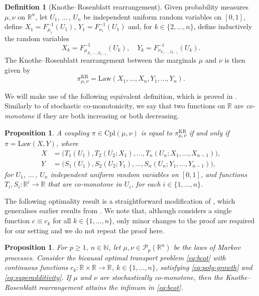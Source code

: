 \documentclass[onseside, final]{amsart}
\newtheorem{proposition}[theorem]{Proposition}
\theoremstyle{definition}
\newtheorem{definition}[theorem]{Definition}
\newcommand{\Pc}{\mathcal P}
\newcommand{\N}{\mathbb N}
\newcommand{\R}{\mathbb R}
\newcommand{\Law}{\mathrm{Law}}
\newcommand{\cpl}{\mathrm{Cpl}}
\newcommand{\kr}{\mathrm{KR}}
\numberwithin{equation}{section}
\begin{document}
			\begin{definition}[Knothe--Rosenblatt rearrangement]\label{def:kr}
					Given probability measures $\mu, \nu$ on $\R^n$, let $U_1$, $\dotsc\,$, $U_n$ be independent uniform random variables on $[0, 1]$, define $X_1 = F_{\mu_1}^{-1}(U_1)$, $Y_1 = F_{\nu_1}^{-1}(U_1)$ and, for $k \in \{2, \dotsc, n\}$, define inductively the random variables
				\begin{equation}
					X_k = F^{-1}_{\mu_{X_1, \dotsc, X_{k - 1}}}(U_k), \quad Y_k = F^{-1}_{\nu_{Y_1, \dotsc, Y_{k - 1}}}(U_k).
				\end{equation}
				The Knothe--Rosenblatt rearrangement between the marginals $\mu$ and $\nu$ is then given by 
				\[
				\pi^\kr_{\mu, \nu} = \Law(X_1, \dotsc, X_n, Y_1, \dotsc, Y_n).
				\]
			\end{definition}
			We will make use of the following equivalent definition, which is proved in \citet[Proposition 5.8]{BaBeLiZa17}. Similarly to  of stochastic co-monotonicity, we say that two functions on $\R$ are \emph{co-monotone} if they are both increasing or both decreasing.
			\begin{proposition}\label{rem:kr-equivalent-def}
				A coupling $\pi \in \cpl(\mu, \nu)$ is equal to $\pi^\kr_{\mu, \nu}$ if and only if $\pi = \Law(X, Y)$, where
				\begin{align}
						X & = \bigl(T_1(U_1), T_2(U_2; X_1), \dotsc, T_n(U_n; X_1, \dotsc, X_{n - 1})\bigr),\\
						Y & = \bigl(S_1(U_1), S_2(U_2; Y_1), \dotsc, S_n(U_n; Y_1, \dotsc, Y_{n - 1})\bigr),
				\end{align}
				for $U_1$, $\dotsc\,$, $U_n$ independent uniform random variables on $[0, 1]$, and functions $T_i, S_i \colon \R^i \to \R$ that are co-monotone in $U_i$, for each $i \in \{1, \dotsc, n\}$.
			\end{proposition}
			
			The following optimality result is a straightforward modification of \citep[Proposition 3.5]{BaKaRo22}, which generalises earlier results from \citet{BaBeLiZa17, Ru85}. We note that, although \citep[Proposition 3.5]{BaKaRo22} considers a single function $c \equiv c_k$ for all $k \in \{1, \dotsc, n\}$, only minor changes to the proof are required for our setting and we do not repeat the proof here.
			
			\begin{proposition}\label{prop:kr-optimal}
				For $p \geq 1$, $n \in \N$, let $\mu, \nu \in \Pc_p(\R^n)$ be the laws of Markov processes. Consider the bicausal optimal transport problem \eqref{eq:bcot} with continuous functions $c_k \colon \R \times \R \to \R$, $k \in \{1, \dotsc, n\}$, satisfying \eqref{eq:poly-growth} and \eqref{eq:superadditivity}. If $\mu$ and $\nu$ are stochastically co-monotone, then the Knothe--Rosenblatt rearrangement attains the infimum in \eqref{eq:bcot}.
			\end{proposition}
			
\end{document}
